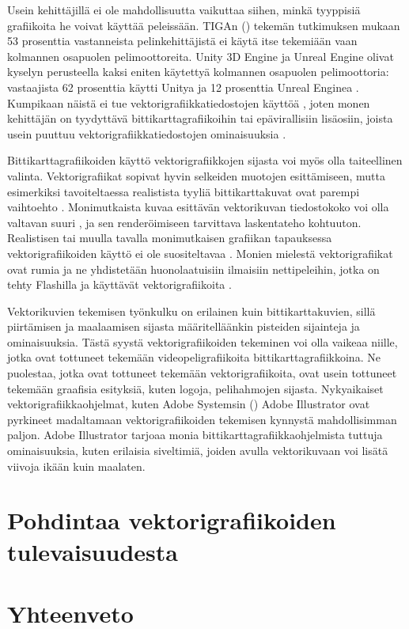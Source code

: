 \documentclass[utf8,bachelor]{gradu3}
\begin{document}
Usein kehittäjillä ei ole mahdollisuutta vaikuttaa siihen, minkä tyyppisiä grafiikoita he voivat käyttää peleissään. TIGAn (\citeyear{RefWorks:doc:5bf14747e4b09ed70a21a7e4}) tekemän tutkimuksen mukaan 53 prosenttia vastanneista pelinkehittäjistä ei käytä itse tekemiään vaan kolmannen osapuolen pelimoottoreita. Unity 3D Engine ja Unreal Engine olivat kyselyn perusteella kaksi eniten käytettyä kolmannen osapuolen pelimoottoria: vastaajista 62 prosenttia käytti Unitya ja 12 prosenttia Unreal Enginea \parencite{RefWorks:doc:5bf14747e4b09ed70a21a7e4}. Kumpikaan näistä ei tue vektorigrafiikkatiedostojen käyttöä \parencites{RefWorks:doc:5bf1684be4b045abd3990077}{RefWorks:doc:5bf168ace4b0d4880bbec9aa}, joten monen kehittäjän on tyydyttävä bittikarttagrafiikoihin tai epävirallisiin lisäosiin, joista usein puuttuu vektorigrafiikkatiedostojen ominaisuuksia \parencites{RefWorks:doc:5bf1712ce4b0efa59d30f4f7}{RefWorks:doc:5bf17193e4b09ed70a21ac25}.

Bittikarttagrafiikoiden käyttö vektorigrafiikkojen sijasta voi myös olla taiteellinen valinta. Vektorigrafiikat sopivat hyvin selkeiden muotojen esittämiseen, mutta esimerkiksi tavoiteltaessa realistista tyyliä bittikarttakuvat ovat parempi vaihtoehto \parencite{RefWorks:doc:5bdc5224e4b05afcfde5b159}. Monimutkaista kuvaa esittävän vektorikuvan tiedostokoko voi olla valtavan suuri \parencite{RefWorks:doc:5bdf4af9e4b0f02deeb8a48a}, ja sen renderöimiseen tarvittava laskentateho kohtuuton. Realistisen tai muulla tavalla monimutkaisen grafiikan tapauksessa vektorigrafiikoiden käyttö ei ole suositeltavaa \parencite{RefWorks:doc:5bdf4af9e4b0f02deeb8a48a}. Monien mielestä vektorigrafiikat ovat rumia ja ne yhdistetään huonolaatuisiin ilmaisiin nettipeleihin, jotka on tehty Flashilla ja käyttävät vektorigrafiikoita \parencite{RefWorks:doc:5bf1b71ae4b0bdd1f93c0e3c}.

Vektorikuvien tekemisen työnkulku on erilainen kuin bittikarttakuvien, sillä piirtämisen ja maalaamisen sijasta määritelläänkin pisteiden sijainteja ja ominaisuuksia. Tästä syystä vektorigrafiikoiden tekeminen voi olla vaikeaa niille, jotka ovat tottuneet tekemään videopeligrafiikoita bittikarttagrafiikkoina. Ne puolestaa, jotka ovat tottuneet tekemään vektorigrafiikoita, ovat usein tottuneet tekemään graafisia esityksiä, kuten logoja, pelihahmojen sijasta. Nykyaikaiset vektorigrafiikkaohjelmat, kuten Adobe Systemsin (\citeyear{RefWorks:doc:5bf1ca5ee4b03fd0c4891238}) Adobe Illustrator ovat pyrkineet madaltamaan vektorigrafiikoiden tekemisen kynnystä mahdollisimman paljon. Adobe Illustrator tarjoaa monia bittikarttagrafiikkaohjelmista tuttuja ominaisuuksia, kuten erilaisia siveltimiä, joiden avulla vektorikuvaan voi lisätä viivoja ikään kuin maalaten. \parencite{RefWorks:doc:5bf1ca5ee4b03fd0c4891238}

\chapter{Pohdintaa vektorigrafiikoiden tulevaisuudesta}


\chapter{Yhteenveto}


\printbibliography
\end{document}
